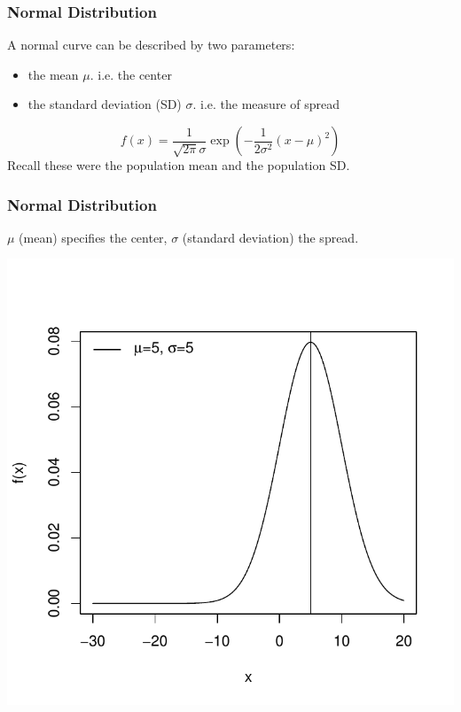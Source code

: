 \documentclass[handout]{beamer}
\newcommand{\blue}[1]{\textcolor{blue2}{#1}}
\begin{document}
\begin{frame}[fragile]
\frametitle{Normal Distribution}

A normal curve can be described by two \blue{parameters}:
\begin{itemize}
\item the \blue{mean $\mu$}. i.e. the center
\item the \blue{standard deviation (SD) $\sigma$}. i.e. the measure of spread
\end{itemize}
\pause\vspace{0.25cm}
\[
f(x) = \frac{1}{\sqrt{2\pi}\sigma}\exp\left( -\frac{1}{2\sigma^2}(x-\mu)^2 \right)
\]
\pause\vspace{0.25cm}
Recall these were the \blue{population mean} and the \blue{population SD}.

\end{frame}


\begin{frame}
\frametitle{Normal Distribution}
$\mu$ (mean) specifies the center, $\sigma$ (standard deviation) the spread.
\begin{center}
\includegraphics{figure/lec02-003}
\end{center}
\end{frame}
\end{document}
